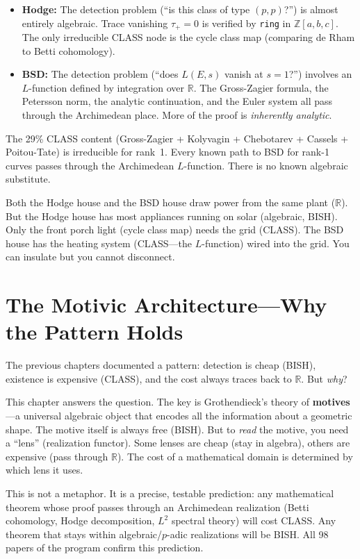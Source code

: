 \documentclass[11pt,twoside,openany]{report}
\theoremstyle{remark}
\newcommand{\BISH}{\textsf{BISH}}
\newcommand{\CLASS}{\textsf{CLASS}}
\begin{document}
\begin{itemize}
  \item \textbf{Hodge:} The detection problem (``is this class of type $(p,p)$?'') is almost entirely algebraic. Trace vanishing $\tau_+ = 0$ is verified by \texttt{ring} in $\mathbb{Z}[a,b,c]$. The only irreducible \CLASS{} node is the cycle class map (comparing de Rham to Betti cohomology).

  \item \textbf{BSD:} The detection problem (``does $L(E,s)$ vanish at $s=1$?'') involves an $L$-function defined by integration over $\mathbb{R}$. The Gross-Zagier formula, the Petersson norm, the analytic continuation, and the Euler system all pass through the Archimedean place. More of the proof is \emph{inherently analytic}.
\end{itemize}

The 29\% \CLASS{} content (Gross-Zagier + Kolyvagin + Chebotarev + Cassels + Poitou-Tate) is irreducible for rank~1. Every known path to BSD for rank-1 curves passes through the Archimedean $L$-function. There is no known algebraic substitute.

\begin{analogybox}
Both the Hodge house and the BSD house draw power from the same plant ($\mathbb{R}$). But the Hodge house has most appliances running on solar (algebraic, \BISH). Only the front porch light (cycle class map) needs the grid (\CLASS). The BSD house has the heating system (\CLASS---the $L$-function) wired into the grid. You can insulate but you cannot disconnect.
\end{analogybox}


\chapter{The Motivic Architecture---Why the Pattern Holds}

\begin{analogybox}
The previous chapters documented a pattern: detection is cheap (\BISH), existence is expensive (\CLASS), and the cost always traces back to $\mathbb{R}$. But \emph{why}?

This chapter answers the question. The key is Grothendieck's theory of \textbf{motives}---a universal algebraic object that encodes all the information about a geometric shape. The motive itself is always free (\BISH). But to \emph{read} the motive, you need a ``lens'' (realization functor). Some lenses are cheap (stay in algebra), others are expensive (pass through $\mathbb{R}$). The cost of a mathematical domain is determined by which lens it uses.

This is not a metaphor. It is a precise, testable prediction: any mathematical theorem whose proof passes through an Archimedean realization (Betti cohomology, Hodge decomposition, $L^2$ spectral theory) will cost \CLASS. Any theorem that stays within algebraic/\mbox{$p$-adic} realizations will be \BISH. All 98 papers of the program confirm this prediction.
\end{analogybox}
\end{document}
